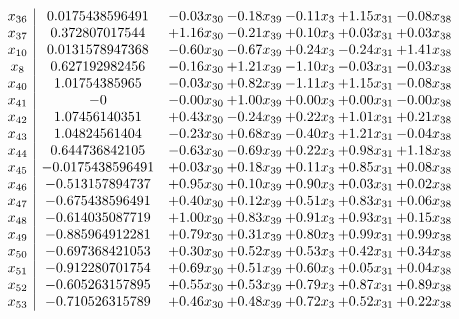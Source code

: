 \documentclass[8pt]{article}
\begin{document}
\[\begin{array}{c| c c@{\hskip 2pt} c@{\hskip 2pt} c@{\hskip 2pt} c@{\hskip 2pt} c@{\hskip 2pt} }
 x_{36}   &  0.0175438596491 & -0.03 x_{30} & -0.18 x_{39} & -0.11 x_{3} & +  1.15 x_{31} & -0.08 x_{38}\\
 x_{37}   &  0.372807017544 & +  1.16 x_{30} & -0.21 x_{39} & +  0.10 x_{3} & +  0.03 x_{31} & +  0.03 x_{38}\\
 x_{10}   &  0.0131578947368 & -0.60 x_{30} & -0.67 x_{39} & +  0.24 x_{3} & -0.24 x_{31} & +  1.41 x_{38}\\
 x_{8}   &  0.627192982456 & -0.16 x_{30} & +  1.21 x_{39} & -1.10 x_{3} & -0.03 x_{31} & -0.03 x_{38}\\
 x_{40}   &  1.01754385965 & -0.03 x_{30} & +  0.82 x_{39} & -1.11 x_{3} & +  1.15 x_{31} & -0.08 x_{38}\\
 x_{41}   &  -0 & -0.00 x_{30} & +  1.00 x_{39} & +  0.00 x_{3} & +  0.00 x_{31} & -0.00 x_{38}\\
 x_{42}   &  1.07456140351 & +  0.43 x_{30} & -0.24 x_{39} & +  0.22 x_{3} & +  1.01 x_{31} & +  0.21 x_{38}\\
 x_{43}   &  1.04824561404 & -0.23 x_{30} & +  0.68 x_{39} & -0.40 x_{3} & +  1.21 x_{31} & -0.04 x_{38}\\
 x_{44}   &  0.644736842105 & -0.63 x_{30} & -0.69 x_{39} & +  0.22 x_{3} & +  0.98 x_{31} & +  1.18 x_{38}\\
 x_{45}   &  -0.0175438596491 & +  0.03 x_{30} & +  0.18 x_{39} & +  0.11 x_{3} & +  0.85 x_{31} & +  0.08 x_{38}\\
 x_{46}   &  -0.513157894737 & +  0.95 x_{30} & +  0.10 x_{39} & +  0.90 x_{3} & +  0.03 x_{31} & +  0.02 x_{38}\\
 x_{47}   &  -0.675438596491 & +  0.40 x_{30} & +  0.12 x_{39} & +  0.51 x_{3} & +  0.83 x_{31} & +  0.06 x_{38}\\
 x_{48}   &  -0.614035087719 & +  1.00 x_{30} & +  0.83 x_{39} & +  0.91 x_{3} & +  0.93 x_{31} & +  0.15 x_{38}\\
 x_{49}   &  -0.885964912281 & +  0.79 x_{30} & +  0.31 x_{39} & +  0.80 x_{3} & +  0.99 x_{31} & +  0.99 x_{38}\\
 x_{50}   &  -0.697368421053 & +  0.30 x_{30} & +  0.52 x_{39} & +  0.53 x_{3} & +  0.42 x_{31} & +  0.34 x_{38}\\
 x_{51}   &  -0.912280701754 & +  0.69 x_{30} & +  0.51 x_{39} & +  0.60 x_{3} & +  0.05 x_{31} & +  0.04 x_{38}\\
 x_{52}   &  -0.605263157895 & +  0.55 x_{30} & +  0.53 x_{39} & +  0.79 x_{3} & +  0.87 x_{31} & +  0.89 x_{38}\\
 x_{53}   &  -0.710526315789 & +  0.46 x_{30} & +  0.48 x_{39} & +  0.72 x_{3} & +  0.52 x_{31} & +  0.22 x_{38}\\

\end{array}\]
\end{document}
